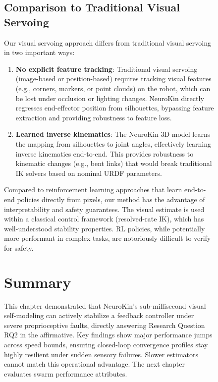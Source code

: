 \documentclass[12pt,a4paper,oneside]{report}
\begin{document}
\begin{figure}[H]
\subsection{Comparison to Traditional Visual Servoing}

Our visual servoing approach differs from traditional visual servoing in two important ways:
\begin{enumerate}
    \item \textbf{No explicit feature tracking}: Traditional visual servoing (image-based or position-based) requires tracking visual features (e.g., corners, markers, or point clouds) on the robot, which can be lost under occlusion or lighting changes. NeuroKin directly regresses end-effector position from silhouettes, bypassing feature extraction and providing robustness to feature loss.
    \item \textbf{Learned inverse kinematics}: The NeuroKin-3D model learns the mapping from silhouettes to joint angles, effectively learning inverse kinematics end-to-end. This provides robustness to kinematic changes (e.g., bent links) that would break traditional IK solvers based on nominal URDF parameters.
\end{enumerate}

Compared to reinforcement learning approaches that learn end-to-end policies directly from pixels, our method has the advantage of interpretability and safety guarantees. The visual estimate is used within a classical control framework (resolved-rate IK), which has well-understood stability properties. RL policies, while potentially more performant in complex tasks, are notoriously difficult to verify for safety.

\section{Summary}

This chapter demonstrated that NeuroKin's sub-millisecond visual self-modeling can actively stabilize a feedback controller under severe proprioceptive faults, directly answering Research Question RQ2 in the affirmative. Key findings show major performance jumps across speed bounds, ensuring closed-loop convergence profiles stay highly resilient under sudden sensory failures. Slower estimators cannot match this operational advantage. The next chapter evaluates swarm performance attributes.
\clearpage


\end{figure}
\end{document}
